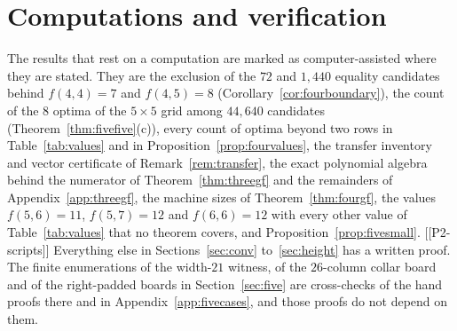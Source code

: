 \section{Computations and verification}\label{sec:verify}

The results that rest on a computation are marked as computer-assisted where they are
stated. They are the exclusion of the $72$ and $1{,}440$ equality candidates behind
$f(4,4)=7$ and $f(4,5)=8$ (Corollary~\ref{cor:fourboundary}), the count of the $8$ optima
of the $5\times5$ grid among $44{,}640$ candidates (Theorem~\ref{thm:fivefive}(c)), every
count of optima beyond two rows in Table~\ref{tab:values} and in
Proposition~\ref{prop:fourvalues}, the transfer inventory and vector certificate of
Remark~\ref{rem:transfer}, the exact polynomial algebra behind the numerator of
Theorem~\ref{thm:threegf} and the remainders of Appendix~\ref{app:threegf}, the machine sizes
of Theorem~\ref{thm:fourgf}, the values $f(5,6)=11$, $f(5,7)=12$ and $f(6,6)=12$ with every
other value of Table~\ref{tab:values} that no theorem covers, and
Proposition~\ref{prop:fivesmall}. [[P2-scripts]] Everything else in Sections~\ref{sec:conv}
to~\ref{sec:height} has a written proof. The finite enumerations of the width-$21$ witness,
of the $26$-column collar board and of the right-padded boards in Section~\ref{sec:five} are
cross-checks of the hand proofs there and in Appendix~\ref{app:fivecases}, and those proofs do
not depend on them.

